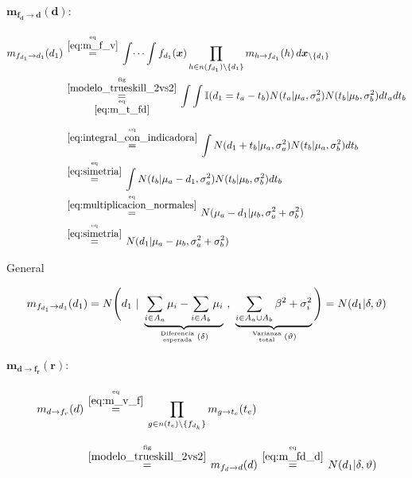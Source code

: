 \documentclass[article]{jss}
\newcommand\hfrac[2]{\genfrac{}{}{0pt}{}{#1}{#2}} %
\begin{document}
\paragraph{$\bm{m_{f_d \rightarrow d}(d)}:$}

\begin{equation}
 \begin{split}
  m_{f_{d_1} \rightarrow d_1}(d_1) & \overset{\hfrac{\text{eq}}{\ref{eq:m_f_v}}}{=} \int \dots \int f_{d_1}(\bm{x}) \prod_{h \in n(f_{d_1}) \setminus \{d_1\} } m_{h \rightarrow f_{d_1}}(h) \, d\bm{x}_{\setminus \{d_1\} }  \\
  & \overset{\hfrac{\text{fig}}{\ref{modelo_trueskill_2vs2}}}{\underset{\hfrac{\text{eq}}{\ref{eq:m_t_fd}}}{=}} \int \int \mathbb{I}(d_1 = t_a - t_b) N(t_a| \mu_a, \sigma_a^2)  N(t_b| \mu_b, \sigma_b^2)  dt_adt_b \\[0.25cm]
  & \overset{\hfrac{\text{eq}}{\ref{eq:integral_con_indicadora}}}{=} \int N(d_1 + t_b| \mu_a, \sigma_a^2)  N(t_b| \mu_a, \sigma_b^2)  dt_b \\
  & \overset{\hfrac{\text{eq}}{\ref{eq:simetria}}}{=} \int N(t_b| \mu_a - d_1 , \sigma_a^2)  N(t_b| \mu_b, \sigma_b^2)  dt_b \\
  & \overset{\hfrac{\text{eq}}{\ref{eq:multiplicacion_normales}}}{=} N( \mu_a - d_1 | \mu_b, \sigma_a^2 +\sigma_b^2  ) \\
  & \overset{\hfrac{\text{eq}}{\ref{eq:simetria}}}{=} N( d_1 | \mu_a - \mu_b, \sigma_a^2 +\sigma_b^2  )
 \end{split}
\end{equation}

General

\begin{equation} \label{eq:m_fd_d}
 m_{f_{d_1} \rightarrow d_1}(d_1) = N\Bigg(d_1 \ | \ \underbrace{\sum_{i \in A_a} \mu_i - \sum_{i \in A_b} \mu_i}_{\hfrac{\text{Diferencia}}{\text{esperada}} \, (\delta)} \ , \  \underbrace{\sum_{i \in A_a \cup A_b} \beta^2 + \sigma_i^2}_{\hfrac{\text{Varianza}}{\text{total}} \, (\vartheta) } \Bigg) = N(d_1 | \delta, \vartheta)
\end{equation}

\paragraph{$\bm{m_{d \rightarrow f_r}(r)}:$}

\begin{equation}\label{eq:m_d_fr}
\begin{split}
m_{d \rightarrow f_r}(d) & \overset{\hfrac{\text{eq}}{\ref{eq:m_v_f}}}{=} \prod_{g \in n(t_e) \setminus  \{f_{d_{k}} \}} m_{g \rightarrow t_e} (t_e) \\[0.3cm]
 & \overset{\hfrac{\text{fig}}{\ref{modelo_trueskill_2vs2}}}{=} m_{f_d \rightarrow d}(d) \overset{\hfrac{\text{eq}}{\ref{eq:m_fd_d}}}{=} N(d_1| \delta, \vartheta)
\end{split}
\end{equation}
\end{document}
